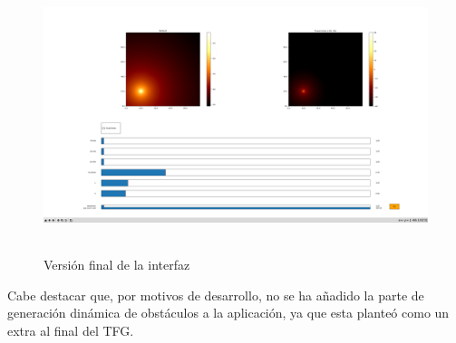 \begin{figure} [H]
    \begin{center}
    \includegraphics[height=8cm]{imagenes/cap4/7_Friss_endGUI.png}
    \end{center}
	\caption[Versión final de la interfaz]{Versión final de la interfaz}
	\label{fig:friis_end_app}
\end{figure}

Cabe destacar que, por motivos de desarrollo, no se ha añadido la parte de generación dinámica de obstáculos a la aplicación, ya que esta planteó como un extra al final del \ac{TFG}.\\





